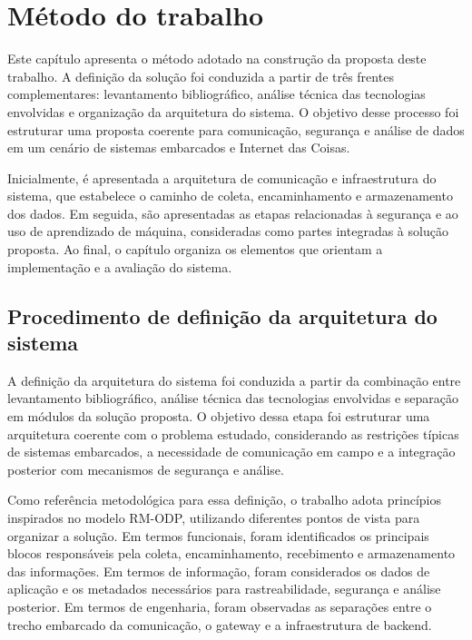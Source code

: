 \chapter{Método do trabalho} \label{cap:metodo}


Este capítulo apresenta o método adotado na construção da proposta deste trabalho. A definição da solução foi conduzida a partir de três frentes complementares: levantamento bibliográfico, análise técnica das tecnologias envolvidas e organização da arquitetura do sistema. O objetivo desse processo foi estruturar uma proposta coerente para comunicação, segurança e análise de dados em um cenário de sistemas embarcados e Internet das Coisas.

Inicialmente, é apresentada a arquitetura de comunicação e infraestrutura do sistema, que estabelece o caminho de coleta, encaminhamento e armazenamento dos dados. Em seguida, são apresentadas as etapas relacionadas à segurança e ao uso de aprendizado de máquina, consideradas como partes integradas à solução proposta. Ao final, o capítulo organiza os elementos que orientam a implementação e a avaliação do sistema.


\section{Procedimento de definição da arquitetura do sistema}

A definição da arquitetura do sistema foi conduzida a partir da combinação entre levantamento bibliográfico, análise técnica das tecnologias envolvidas e separação em módulos da solução proposta. O objetivo dessa etapa foi estruturar uma arquitetura coerente com o problema estudado, considerando as restrições típicas de sistemas embarcados, a necessidade de comunicação em campo e a integração posterior com mecanismos de segurança e análise.

Como referência metodológica para essa definição, o trabalho adota princípios inspirados no modelo RM-ODP, utilizando diferentes pontos de vista para organizar a solução. Em termos funcionais, foram identificados os principais blocos responsáveis pela coleta, encaminhamento, recebimento e armazenamento das informações. Em termos de informação, foram considerados os dados de aplicação e os metadados necessários para rastreabilidade, segurança e análise posterior. Em termos de engenharia, foram observadas as separações entre o trecho embarcado da comunicação, o gateway e a infraestrutura de backend.

